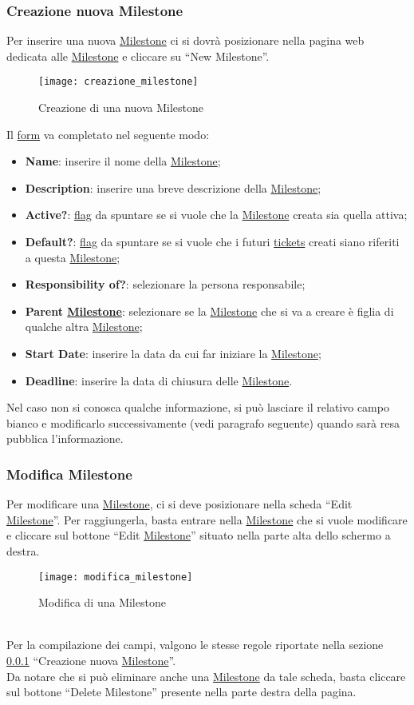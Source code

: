\subsubsection{Creazione nuova Milestone}
\label{sec:creazione_milestone}
Per inserire una nuova \underline{Milestone} ci si dovrà posizionare nella pagina web dedicata alle \underline{Milestone} e cliccare su ``New Milestone''.
\begin{figure}[h]
\texttt{[image: creazione\_milestone]}
\caption{Creazione di una nuova Milestone} \label{fig:creazione_milestone}
\end{figure}
Il \underline{form} va completato nel seguente modo:
\begin{itemize}
\item \textbf{Name}: inserire il nome della \underline{Milestone};
\item \textbf{Description}: inserire una breve descrizione della \underline{Milestone};
\item \textbf{Active?}: \underline{flag} da spuntare se si vuole che la \underline{Milestone} creata sia quella attiva;
\item \textbf{Default?}: \underline{flag} da spuntare se si vuole che i futuri \underline{tickets} creati siano riferiti a questa \underline{Milestone};
\item \textbf{Responsibility of?}: selezionare la persona responsabile;
\item \textbf{Parent \underline{Milestone}}: selezionare se la \underline{Milestone} che si va a creare è figlia di qualche altra \underline{Milestone};
\item \textbf{Start Date}: inserire la data da cui far iniziare la \underline{Milestone};
\item \textbf{Deadline}: inserire la data di chiusura delle \underline{Milestone}.
\end{itemize}
Nel caso non si conosca qualche informazione, si può lasciare il relativo campo bianco e modificarlo successivamente (vedi paragrafo seguente) quando sarà resa pubblica l'informazione.

\subsubsection{Modifica Milestone}
Per modificare una \underline{Milestone}, ci si deve posizionare nella scheda ``Edit \underline{Milestone}''. Per raggiungerla, basta entrare nella \underline{Milestone} che si vuole modificare e cliccare sul bottone ``Edit \underline{Milestone}'' situato nella parte alta dello schermo a destra.
\begin{figure}[h]
\texttt{[image: modifica\_milestone]}
\caption{Modifica di una Milestone} \label{fig:modifica_milestone}
\end{figure}
\\Per la compilazione dei campi, valgono le stesse regole riportate nella sezione \ref{sec:creazione_milestone} ``Creazione nuova \underline{Milestone}''.
\\Da notare che si può eliminare anche una \underline{Milestone} da tale scheda, basta cliccare sul bottone ``Delete Milestone'' presente nella parte destra della pagina.

